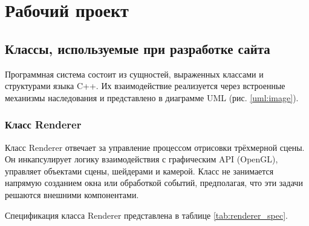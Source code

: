 \section{Рабочий проект}

\subsection{Классы, используемые при разработке сайта}

Программная система состоит из сущностей, выраженных классами и структурами языка C++. Их взаимодействие реализуется через встроенные механизмы наследования и представлено в диаграмме UML (рис. \ref{uml:image}).


\subsubsection{Класс Renderer}
Класс Renderer отвечает за управление процессом отрисовки трёхмерной сцены. Он инкапсулирует логику взаимодействия с графическим API (OpenGL), управляет объектами сцены, шейдерами и камерой. Класс не занимается напрямую созданием окна или обработкой событий, предполагая, что эти задачи решаются внешними компонентами.

Спецификация класса Renderer представлена в таблице \ref{tab:renderer_spec}.

